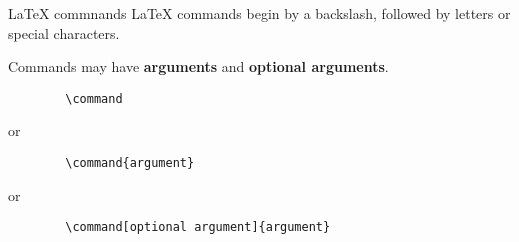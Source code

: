 \copyrightTim

\begin{frame}[fragile]{LaTeX commnands}
    LaTeX commands begin by a backslash, followed by letters or special characters.

    Commands may have \textbf{arguments} and \textbf{optional arguments}.

    \begin{verbatim}
        \command
    \end{verbatim}
    or
    \begin{verbatim}
        \command{argument}
    \end{verbatim}
    or
    \begin{verbatim}
        \command[optional argument]{argument}
    \end{verbatim}

\end{frame}